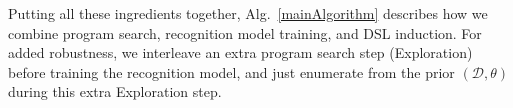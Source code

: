 \documentclass{article}
\newcommand{\system}{\textsc{EC$^2$} }
\newcommand{\probability}{\mathds{P}} %
\begin{document}
Putting all these ingredients together, Alg.~\ref{mainAlgorithm} describes how we combine program search,
recognition model training, and DSL induction.
For added robustness,
we interleave an extra program search step (Exploration) before training the recognition model,
and just enumerate from the prior $(\mathcal{D},\theta)$ during this extra Exploration step.
 

\end{document}
